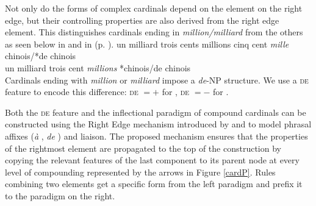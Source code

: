 \documentclass[output=paper]{langsci/langscibook}
\begin{document}
Not only do the forms of complex cardinals  depend on the element on the right edge, but their controlling properties are also derived from the right edge element. This distinguishes cardinals  ending in \emph{million/milliard} from the others as seen below in  and in  (p. \pageref{numOpposition}).
\ea\label{cardOpposition}
	\ea\label{cardN} un milliard trois cents millions cinq cent \emph{mille} chinois/*de chinois \\ 
	\ex\label{cardDeN} un milliard trois cent \emph{millions} *chinois/de chinois \\ 
	\z
\z
Cardinals ending with \emph{million}  or \emph{milliard}  impose a \emph{de}-NP structure. We use a \textsc{de} feature to encode this difference: \textsc{de} $= +$ for , \textsc{de} $= -$ for .

Both the \textsc{de} feature and the inflectional  paradigm  of compound  cardinals  can be constructed using the Right Edge mechanism introduced by \citet{Tseng03} and \citet{BoBoTse04} to model  phrasal affixes (\emph{à} , \emph{de} ) and liaison. The proposed mechanism ensures that the properties of the rightmost element are propagated to the top of the construction by copying the relevant features of the last component to its parent node at every level of compounding  represented by the arrows in Figure \ref{cardP}. Rules combining two elements get a specific form from the left paradigm  and prefix it to the paradigm  on the right.
\end{document}
